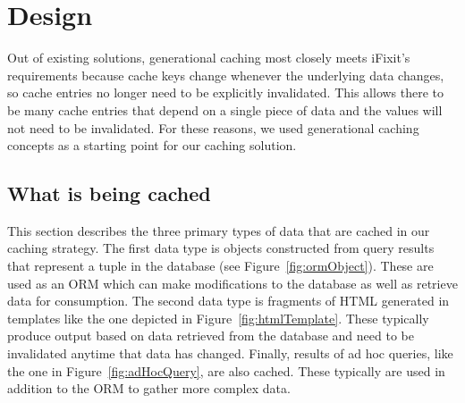 \documentclass[12pt]{ucthesis}
\begin{document}
\section{Design} \label{design}
Out of existing solutions, generational caching most closely meets \textsf{iFixit}'s requirements because cache keys change whenever the underlying data changes, so cache entries no longer need to be explicitly invalidated.
This allows there to be many cache entries that depend on a single piece of data and the values will not need to be invalidated.
For these reasons, we used generational caching concepts as a starting point for our caching solution.

\subsection{What is being cached}
This section describes the three primary types of data that are cached in our caching strategy.
The first data type is objects constructed from query results that represent a tuple in the database (see Figure~\ref{fig:ormObject}).
These are used as an ORM which can make modifications to the database as well as retrieve data for consumption.
The second data type is fragments of HTML generated in templates like the one depicted in Figure~\ref{fig:htmlTemplate}.
These typically produce output based on data retrieved from the database and need to be invalidated anytime that data has changed.
Finally, results of ad hoc queries, like the one in Figure~\ref{fig:adHocQuery}, are also cached.
These typically are used in addition to the ORM to gather more complex data.
\end{document}
